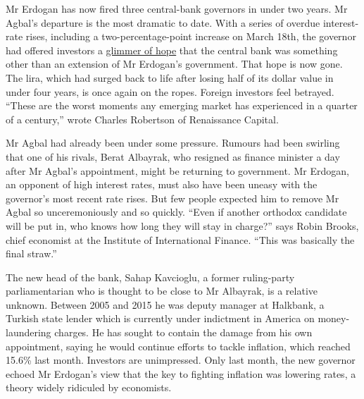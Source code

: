 \documentclass{article}
\begin{document}
Mr Erdogan has now fired three central-bank governors in under two years. Mr Agbal's departure is the most dramatic to date. With a series of overdue interest-rate rises, including a two-percentage-point increase on March 18th, the governor had offered investors a \href{/europe/2021/03/20/naci-agbal-tries-to-restore-monetary-discipline-in-turkey}{glimmer of hope} that the central bank was something other than an extension of Mr Erdogan's government. That hope is now gone. The lira, which had surged back to life after losing half of its dollar value in under four years, is once again on the ropes. Foreign investors feel betrayed. ``These are the worst moments any emerging market has experienced in a quarter of a century,'' wrote Charles Robertson of Renaissance Capital. 

 

Mr Agbal had already been under some pressure. Rumours had been swirling that one of his rivals, Berat Albayrak, who resigned as finance minister a day after Mr Agbal's appointment, might be returning to government. Mr Erdogan, an opponent of high interest rates, must also have been uneasy with the governor's most recent rate rises. But few people expected him to remove Mr Agbal so unceremoniously and so quickly. ``Even if another orthodox candidate will be put in, who knows how long they will stay in charge?'' says Robin Brooks, chief economist at the Institute of International Finance. ``This was basically the final straw.'' 

The new head of the bank, Sahap Kavcioglu, a former ruling-party parliamentarian who is thought to be close to Mr Albayrak, is a relative unknown. Between 2005 and 2015 he was deputy manager at Halkbank, a Turkish state lender which is currently under indictment in America on money-laundering charges. He has sought to contain the damage from his own appointment, saying he would continue efforts to tackle inflation, which reached 15.6\% last month. Investors are unimpressed. Only last month, the new governor echoed Mr Erdogan's view that the key to fighting inflation was lowering rates, a theory widely ridiculed by economists. 
\end{document}
